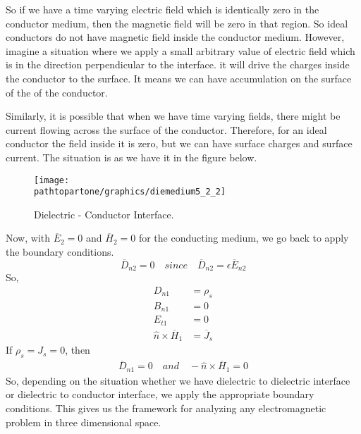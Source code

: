 So if we have a time varying electric field which is identically zero in the conductor medium, then the magnetic field will be zero in that region. So ideal conductors do not have magnetic field inside the conductor medium. However, imagine a situation where we apply a small arbitrary value of electric field which is in the direction perpendicular to the interface. it will drive the charges inside the conductor to the surface. It means we can have accumulation on the surface of the of the conductor. 

Similarly, it is possible that when we have time varying fields, there might be current flowing across the surface of the conductor. Therefore, for an ideal conductor the field inside it is zero, but we can have surface charges and surface current. The situation is as we have it in the figure below.
\begin{figure}[h]
\centering
\texttt{[image: \\pathtopartone/graphics/diemedium5\_2\_2]}
\caption{Dielectric - Conductor Interface.}
\end{figure}

Now, with $\overline{E}_2 = 0$ and $\overline{H}_2 = 0$ for the conducting medium, we go back to apply the boundary conditions.
\begin{equation*}
\overline{D}_{n2} = 0\quad since\quad \overline{D}_{n2} = \epsilon\overline{E}_{n2}
\end{equation*}
So,
\begin{align*}
D_{n1} &= \rho_s \\
B_{n1} &= 0 \\
E_{t1} &= 0 \\
\hat{n}\times\overline{H}_1 &= \overline{J}_s
\end{align*}
If $\rho_s = J_s = 0$, then
\begin{align*}
\overline{D}_{n1} = 0\quad and \quad -\hat{n}\times\overline{H}_{1} = 0
\end{align*}
So, depending on the situation whether we have dielectric to dielectric interface or dielectric to conductor interface, we apply the appropriate boundary conditions. This gives us the framework for analyzing any electromagnetic problem in three dimensional space. 

